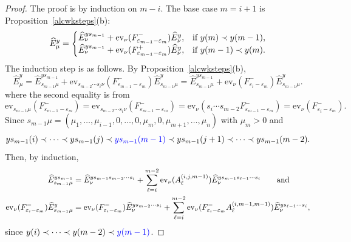 \documentclass[11pt]{article}
\theoremstyle{plain}
\theoremstyle{definition}
\theoremstyle{remark}
\numberwithin{equation}{section}
\def\ev{\mathrm{ev}}
\newcounter{r}
\newcounter{s}
\begin{document}
\begin{proof}

The proof is by induction on $m - i$.  
The base case $m = i+1$ is Proposition~\ref{alcwksteps}(b):
$$
\widehat{E}^y_\mu = \begin{cases}
\widehat{E}^{ys_{m-1}}_\nu+ \ev_\nu(F_{\varepsilon_{m-1}-\varepsilon_m}^-) \widehat{E}^y_\nu, &\hbox{if $y(m)\prec y(m-1)$,} \\
\widehat{E}^{ys_{m-1}}_\nu+ \ev_\nu(F_{\varepsilon_{m-1}-\varepsilon_m}^+) \widehat{E}^y_\nu, &\hbox{if $y(m-1)\prec y(m)$.} 
\end{cases}
$$
The induction step is as follows. By Proposition~\ref{alcwksteps}(b),
\begin{equation*}
\widehat{E}^y_\mu
= \widehat{E}^{ys_{m-1}}_{s_{m-1}\mu} 
+ \ev_{s_{m-2}\cdots s_i\nu}(F^-_{\varepsilon_{m-1}-\varepsilon_m})\widehat{E}^y_{s_{m-1}\mu}
= \widehat{E}^{ys_{m-1}}_{s_{m-1}\mu} 
+ \ev_\nu(F^-_{\varepsilon_i-\varepsilon_m})\widehat{E}^y_{s_{m-1}\mu}.
\end{equation*}
where the second equality is from
$$
\ev_{s_{m-1}\mu}(F^-_{\varepsilon_{m-1}-\varepsilon_m})
=\ev_{s_{m-2}\cdots s_i\nu}(F^-_{\varepsilon_{m-1} - \varepsilon_m})
= \ev_\nu(s_i\cdots s_{m-2}F^-_{\varepsilon_{m-1} - \varepsilon_m})
= \ev_\nu(F^-_{\varepsilon_i - \varepsilon_m}).
$$
Since
$s_{m-1}\mu = (\mu_1,\ldots, \mu_{i-1}, 0, \ldots, 0, \mu_m, 0, \mu_{m+1}, \ldots, \mu_n)$ with $\mu_m>0$ and
$$
ys_{m-1}(i) \prec \cdots \prec   ys_{m-1}(j) \prec {\color{blue} ys_{m-1}(m-1)} \prec ys_{m-1}(j+1)
\prec \cdots \prec ys_{m-1}(m-2). 
$$
Then, by induction,
\begin{align*}
\widehat{E}^{ys_{m-1}}_{s_{m-1}\mu} 
&= \widehat{E}_\nu^{ys_{m-1}s_{m-2}\cdots s_i}  
+\sum_{\ell = i}^{m-2}
\ev_\nu(A_\ell^{(i,j,m-1)})
\widehat{E}_\nu^{ys_{m-1}s_{\ell-1}\cdots s_i} \qquad\hbox{and}\\
\ev_\nu(F^-_{\varepsilon_i-\varepsilon_m})\widehat{E}^y_{s_{m-1}\mu}
&= \ev_\nu(F^-_{\varepsilon_i-\varepsilon_m}) \widehat{E}_\nu^{ys_{m-2}\cdots s_i}
+\sum_{\ell = i}^{m-2}
\ev_\nu(F^-_{\varepsilon_i-\varepsilon_m} A_\ell^{(i,m-1,m-1)})
\widehat{E}_\nu^{ys_{\ell-1}\cdots s_i},
\end{align*}
since $y(i)\prec \cdots \prec y(m-2)\prec {\color{blue}  y(m-1)}$.



\end{proof}
\end{document}
